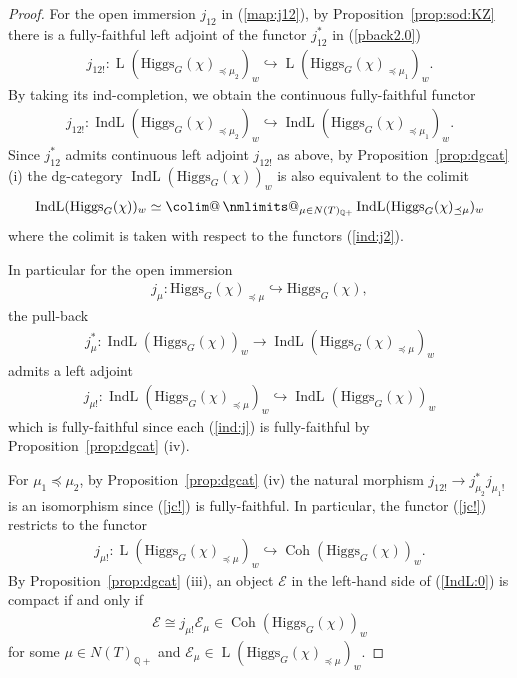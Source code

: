 \documentclass [11pt,oneside,a4paper,mathscr]{amsart}
\makeatletter
\theoremstyle{definition}
\newcommand{\E}{\mathcal{E}}
\newcommand{\LL}{\operatorname{L}}
\newcommand{\Coh}{\operatorname{Coh}}
\newcommand{\IndL}{\operatorname{IndL}}
\newcommand{\Hig}{\mathrm{Higgs}}
\newcommand{\colim@}[2]{%
  \vtop{\m@th\ialign{##\cr
    \hfil$#1\operator@font colim$\hfil\cr
    \noalign{\nointerlineskip\kern1.5\ex@}#2\cr
    \noalign{\nointerlineskip\kern-\ex@}\cr}}%
}
\newcommand{\colim}{%
  \mathop{\mathpalette\colim@{}}\nmlimits@
}
\makeatother
\begin{document}
\begin{proof}
For the open immersion $j_{12}$ in (\ref{map:j12}), 
by Proposition~\ref{prop:sod:KZ} there is a fully-faithful 
left adjoint of the functor $j_{12}^{\ast}$ in (\ref{pback2.0})
\begin{align}\label{j12!}
	j_{12!} \colon \LL(\Hig_G(\chi)_{\preceq \mu_2})_w \hookrightarrow 
	\LL(\Hig_G(\chi)_{\preceq \mu_1})_w. 
	\end{align}	
By taking its ind-completion, we obtain the continuous fully-faithful functor
\begin{align}\label{ind:j2}
	j_{12!} \colon \IndL(\Hig_G(\chi)_{\preceq \mu_2})_w \hookrightarrow 
	\IndL(\Hig_G(\chi)_{\preceq \mu_1})_w. 
	\end{align}
    Since $j_{12}^*$ admits continuous left adjoint $j_{12!}$ as above, 
by Proposition~\ref{prop:dgcat} (i) the dg-category 
$\IndL(\Hig_G(\chi))_w$ is also equivalent to the colimit 
\begin{align}\label{IndL:0}
	\IndL(\Hig_G(\chi))_w \simeq \colim_{\mu \in N(T)_{\mathbb{Q}+}} \IndL(\Hig_G(\chi)_{\preceq \mu})_w
	\end{align}
where the colimit is taken 
with respect to the functors (\ref{ind:j2}). 

In particular for the open immersion \begin{align*}j_{\mu} \colon \Hig_G(\chi)_{\preceq \mu} \hookrightarrow \Hig_G(\chi),\end{align*} 
the pull-back 
\begin{align*}
	j_{\mu}^{\ast} \colon \IndL(\Hig_G(\chi))_w \to \IndL(\Hig_G(\chi)_{\preceq \mu})_w
	\end{align*}
admits a left adjoint 
\begin{align}\label{jc!}
	j_{\mu!} \colon \IndL(\Hig_G(\chi)_{\preceq \mu})_w \hookrightarrow \IndL(\Hig_G(\chi))_w
	\end{align}
which is fully-faithful since each (\ref{ind:j}) is fully-faithful by Proposition~\ref{prop:dgcat} (iv). 

For $\mu_1 \preceq \mu_2$, by Proposition~\ref{prop:dgcat} (iv) the natural morphism 
$j_{12!} \to j_{\mu_2}^{\ast}j_{\mu_1!}$
is an isomorphism since (\ref{jc!}) is fully-faithful. 
In particular, the functor (\ref{jc!}) restricts to the functor 
\begin{align*}
    j_{\mu!} \colon \LL(\Hig_G(\chi)_{\preceq \mu})_w \hookrightarrow \Coh(\Hig_G(\chi))_w. 
\end{align*}
By Proposition~\ref{prop:dgcat} (iii), an object $\E$ in the left-hand side of (\ref{IndL:0}) is compact if and only 
if 
\begin{align}\label{jcE}\E \cong j_{\mu!}\E_{\mu} \in \Coh(\Hig_G(\chi))_w
	\end{align}
for some $\mu \in N(T)_{\mathbb{Q}+}$ and 
$\E_{\mu} \in \LL(\Hig_G(\chi)_{\preceq \mu})_w$. 


\end{proof}
\end{document}

